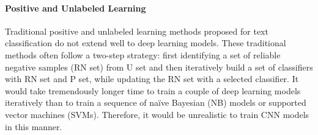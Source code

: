 


\paragraph{Positive and Unlabeled Learning}

Traditional positive and unlabeled learning methods proposed for text classification \cite{liu2003building} do not extend well to deep learning models.
These traditional methods often follow a two-step strategy: first identifying a set of reliable negative samples (RN set) from U set and then iteratively build a set of classifiers with RN set and P set, while updating the RN set with a selected classifier.
It would take tremendously longer time to train a couple of deep learning models iteratively than to train a sequence of na\"ive Bayesian (NB) models or supported vector machines (SVMs).
Therefore, it would be unrealistic to train CNN models in this manner.

